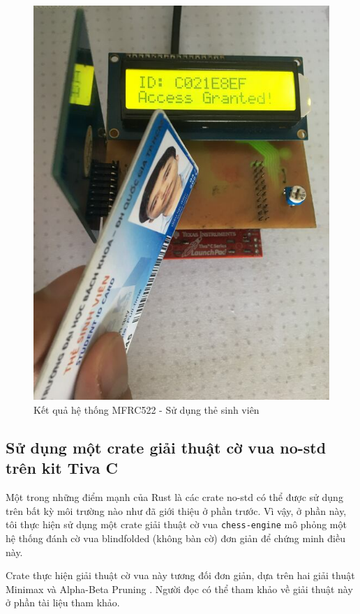\begin{figure}[ht]
\centering
\includegraphics[scale=0.3]{images/mfrc522_student.jpg}
\caption{Kết quả hệ thống MFRC522 - Sử dụng thẻ sinh viên}
\label{fig:rc522_student}
\end{figure}

\clearpage
\subsection{Sử dụng một crate giải thuật cờ vua no-std trên kit Tiva C}
Một trong những điểm mạnh của Rust là các crate no-std có thể được sử dụng trên bất kỳ môi trường nào như đã giới thiệu ở phần trước.
Vì vậy, ở phần này, tôi thực hiện sử dụng một crate giải thuật cờ vua \texttt{chess-engine} \cite{rust_chess_engine} mô phỏng một hệ thống đánh cờ vua blindfolded (không bàn cờ) đơn giản để chứng minh điều này.

Crate thực hiện giải thuật cờ vua này tương đối đơn giản, dựa trên hai giải thuật Minimax \cite{minimax_chess_programming} và Alpha-Beta Pruning \cite{alpha_beta_chess_programming}.
Người đọc có thể tham khảo về giải thuật này ở phần tài liệu tham khảo.

